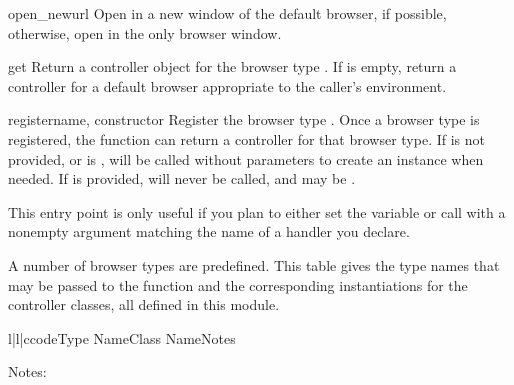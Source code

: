 \begin{funcdesc}{open_new}{url}
  Open  in a new window of the default browser, if possible,
  otherwise, open  in the only browser window.
\end{funcdesc}

\begin{funcdesc}{get}{}
  Return a controller object for the browser type .  If
   is empty, return a controller for a default browser
  appropriate to the caller's environment.
\end{funcdesc}

\begin{funcdesc}{register}{name, constructor}
  Register the browser type .  Once a browser type is
  registered, the  function can return a controller
  for that browser type.  If  is not provided, or is
  ,  will be called without parameters to
  create an instance when needed.  If  is provided,
   will never be called, and may be .

  This entry point is only useful if you plan to either set the
   variable or call  with a nonempty
  argument matching the name of a handler you declare.  
\end{funcdesc}

A number of browser types are predefined.  This table gives the type
names that may be passed to the  function and the
corresponding instantiations for the controller classes, all defined
in this module.

\begin{tableiii}{l|l|c}{code}{Type Name}{Class Name}{Notes}
\end{tableiii}

\noindent
Notes:

